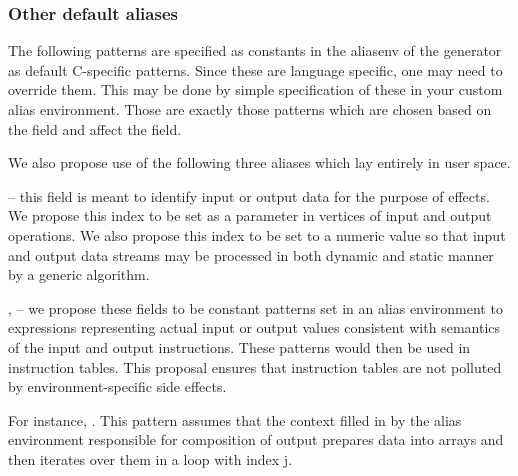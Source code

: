 \subsubsection{Other default aliases}

The following patterns are specified as constants in the aliasenv of the generator as default C-specific patterns. Since these are language specific, one may need to override them. This may be done by simple specification of these in your custom alias environment. Those are exactly those patterns which are chosen based on the  field and affect the  field.

\begin{description}
\item {}
\item {}
\item {}
\item {}
\item {}
\end{description}

We also propose use of the following three aliases which lay entirely in user space.

\begin{description}
  \item {} -- this field is meant to identify input or output data for the purpose of effects. We propose this index to be set as a parameter in vertices of input and output operations. We also propose this index to be set to a numeric value so that input and output data streams may be processed in both dynamic and static manner by a generic algorithm.
  \item {},  -- we propose these fields to be constant patterns set in an alias environment to expressions representing actual input or output values consistent with semantics of the input and output instructions. These patterns would then be used in instruction tables. This proposal ensures that instruction tables are not polluted by environment-specific side effects. 

  For instance, . This pattern assumes that the context filled in by the alias environment responsible for composition of output prepares data into arrays and then iterates over them in a loop with index j. 
\end{description}



